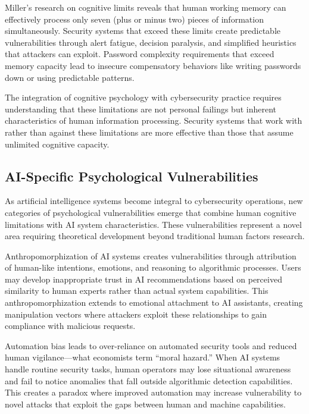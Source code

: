 \documentclass[11pt,a4paper]{article}
\begin{document}
Miller's research on cognitive limits reveals that human working memory can effectively process only seven (plus or minus two) pieces of information simultaneously\cite{miller1956}. Security systems that exceed these limits create predictable vulnerabilities through alert fatigue, decision paralysis, and simplified heuristics that attackers can exploit. Password complexity requirements that exceed memory capacity lead to insecure compensatory behaviors like writing passwords down or using predictable patterns.

The integration of cognitive psychology with cybersecurity practice requires understanding that these limitations are not personal failings but inherent characteristics of human information processing. Security systems that work with rather than against these limitations are more effective than those that assume unlimited cognitive capacity.

\subsection{AI-Specific Psychological Vulnerabilities}

As artificial intelligence systems become integral to cybersecurity operations, new categories of psychological vulnerabilities emerge that combine human cognitive limitations with AI system characteristics. These vulnerabilities represent a novel area requiring theoretical development beyond traditional human factors research.

Anthropomorphization of AI systems creates vulnerabilities through attribution of human-like intentions, emotions, and reasoning to algorithmic processes. Users may develop inappropriate trust in AI recommendations based on perceived similarity to human experts rather than actual system capabilities. This anthropomorphization extends to emotional attachment to AI assistants, creating manipulation vectors where attackers exploit these relationships to gain compliance with malicious requests.

Automation bias leads to over-reliance on automated security tools and reduced human vigilance—what economists term ``moral hazard.'' When AI systems handle routine security tasks, human operators may lose situational awareness and fail to notice anomalies that fall outside algorithmic detection capabilities. This creates a paradox where improved automation may increase vulnerability to novel attacks that exploit the gaps between human and machine capabilities.
\end{document}
